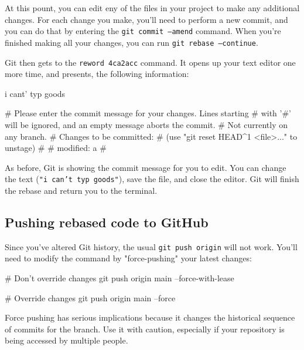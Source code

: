 At this pount, you can edit eny of the files in your project to make any additional changes. For each change you make, you'll need to perform a new commit, and you can do that by entering the \texttt{git commit --amend} command. When you're finished making all your changes, you can run \texttt{git rebase --continue}.

Git then gets to the \texttt{reword 4ca2acc} command. It opens up your text editor one more time, and presents, the following information:
\begin{codeblock}[language=bash]
i cant' typ goods

# Please enter the commit message for your changes. Lines starting
# with '#' will be ignored, and an empty message aborts the commit.
# Not currently on any branch.
# Changes to be committed:
#   (use "git reset HEAD^1 <file>..." to unstage)
#
# modified:   a
#   
\end{codeblock}

As before, Git is showing the commit message for you to edit. You can change the text (\texttt{"i can't typ goods"}), save the file, and close the editor. Git will finish the rebase and return you to the terminal. 

\subsection{Pushing rebased code to GitHub}
Since you've altered Git history, the usual \texttt{git push origin} will not work. You'll need to modify the command by "force-pushing" your latest changes:
\begin{codeblock}[language=bash]
# Don't override changes
git push origin main --force-with-lease

# Override changes
git push origin main --force
\end{codeblock}

\begin{warningblock}
    Force pushing has serious implications because it changes the historical sequence of commits for the branch. Use it with caution, especially if your repository is being accessed by multiple people.
\end{warningblock}


